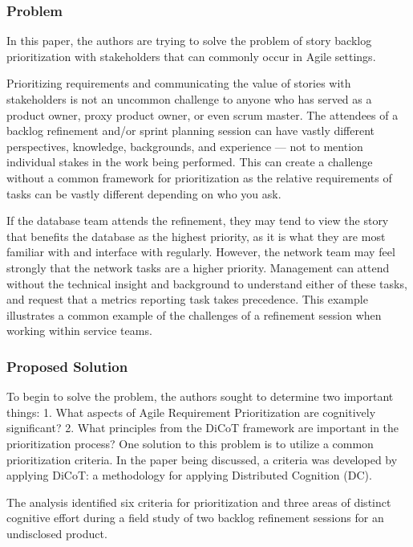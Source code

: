\subsubsection{Problem}
In this paper\cite{buchan2020applying}, the authors are trying to solve the problem of story backlog prioritization with stakeholders that can commonly occur in Agile settings.

Prioritizing requirements and communicating the value of stories with stakeholders is not an uncommon challenge to anyone who has served as a product owner, proxy product owner, or even scrum master. The attendees of a backlog refinement and/or sprint planning session can have vastly different perspectives, knowledge, backgrounds, and experience --- not to mention individual stakes in the work being performed. This can create a challenge without a common framework for prioritization as the relative requirements of tasks can be vastly different depending on who you ask.

If the database team attends the refinement, they may tend to view the story that benefits the database as the highest priority, as it is what they are most familiar with and interface with regularly. However, the network team may feel strongly that the network tasks are a higher priority. Management can attend without the technical insight and background to understand either of these tasks, and request that a metrics reporting task takes precedence. This example illustrates a common example of the challenges of a refinement session when working within service teams.

\subsubsection{Proposed Solution}
To begin to solve the problem, the authors sought to determine two important things:
1. What aspects of Agile Requirement Prioritization are cognitively significant?
2. What principles from the DiCoT framework are important in the prioritization process?
One solution to this problem is to utilize a common prioritization criteria. In the paper being discussed\cite{buchan2020applying}, a criteria was developed by applying DiCoT\cite{blandford2005dicot}: a methodology for applying Distributed Cognition (DC)\cite{hutchins2000distributed}.

The analysis identified six criteria for prioritization and three areas of distinct cognitive effort during a field study of two backlog refinement sessions for an undisclosed product.

